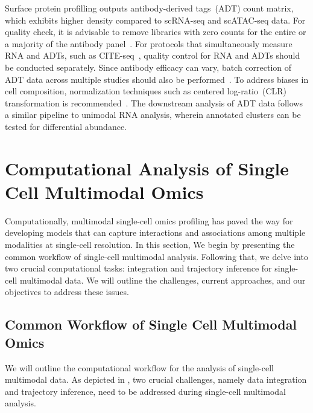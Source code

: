 Surface protein profilling outputs antibody-derived tags~(ADT) count matrix, which exhibits higher density compared to scRNA-seq and scATAC-seq data. For quality check, it is advisable to remove libraries with zero counts for the entire or a majority of the antibody panel~\citep{amezquita2020adtqc}. For protocols that simultaneously measure RNA and ADTs, such as CITE-seq~\citep{citeseq2017}, quality control for RNA and ADTs should be conducted separately. Since antibody efficacy can vary, batch correction of ADT data across multiple studies should also be performed~\citep{zheng2022adtqc}. To address biases in cell composition, normalization techniques such as centered log-ratio~(CLR) transformation is recommended~\citep{stoeckius2017citeseq}. The downstream analysis of ADT data follows a similar pipeline to unimodal RNA analysis, wherein annotated clusters can be tested for differential abundance.


\section{Computational Analysis of Single Cell Multimodal Omics}
\label{background:multimodal}
Computationally, multimodal single-cell omics profiling has paved the way for developing models that can capture interactions and associations among multiple modalities at single-cell resolution. In this section, We begin by presenting the common workflow of single-cell multimodal analysis. Following that, we delve into two crucial computational tasks: integration and trajectory inference for single-cell multimodal data. We will outline the challenges, current approaches, and our objectives to address these issues.

\subsection{Common Workflow of Single Cell Multimodal Omics}
\label{background:multimodal:workflow}
We will outline the computational workflow for the analysis of single-cell multimodal data. As depicted in , two crucial challenges, namely data integration and trajectory inference, need to be addressed during single-cell multimodal analysis.

